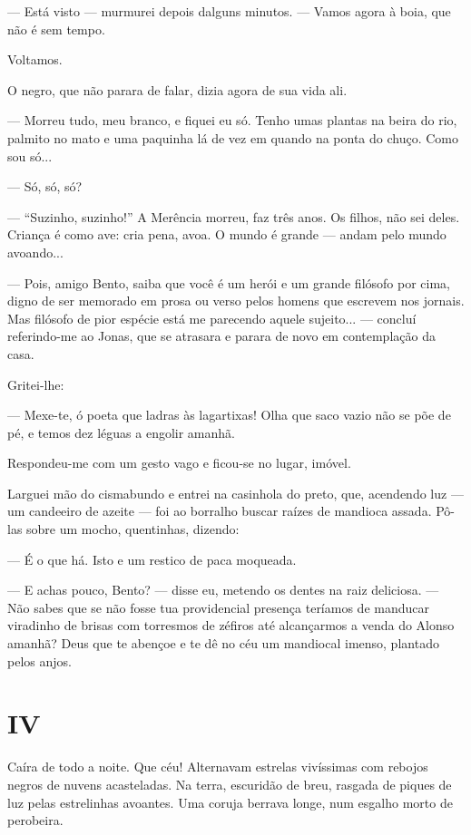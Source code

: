 --- Está visto --- murmurei depois dalguns minutos. --- Vamos agora à
boia, que não é sem tempo.

Voltamos.

O negro, que não parara de falar, dizia agora de sua vida ali.

--- Morreu tudo, meu branco, e fiquei eu só. Tenho umas plantas na beira
do rio, palmito no mato e uma paquinha lá de vez em quando na ponta do
chuço. Como sou só...

--- Só, só, só?

--- ``Suzinho, suzinho!'' A Merência morreu, faz três anos. Os filhos,
não sei deles. Criança é como ave: cria pena, avoa. O mundo é grande ---
andam pelo mundo avoando...

--- Pois, amigo Bento, saiba que você é um herói e um grande filósofo
por cima, digno de ser memorado em prosa ou verso pelos homens que
escrevem nos jornais. Mas filósofo de pior espécie está me parecendo
aquele sujeito... --- concluí referindo-me ao Jonas, que se atrasara e
parara de novo em contemplação da casa.

Gritei-lhe:

--- Mexe-te, ó poeta que ladras às lagartixas! Olha que saco vazio não
se põe de pé, e temos dez léguas a engolir amanhã.

Respondeu-me com um gesto vago e ficou-se no lugar, imóvel.

Larguei mão do cismabundo e entrei na casinhola do preto, que, acendendo
luz --- um candeeiro de azeite --- foi ao borralho buscar raízes de
mandioca assada. Pô-las sobre um mocho, quentinhas, dizendo:

--- É o que há. Isto e um restico de paca moqueada.

--- E achas pouco, Bento? --- disse eu, metendo os dentes na raiz
deliciosa. --- Não sabes que se não fosse tua providencial presença
teríamos de manducar viradinho de brisas com torresmos de zéfiros até
alcançarmos a venda do Alonso amanhã? Deus que te abençoe e te dê no céu
um mandiocal imenso, plantado pelos anjos.

\section{IV}

Caíra de todo a noite. Que céu! Alternavam estrelas vivíssimas com
rebojos negros de nuvens acasteladas. Na terra, escuridão de breu,
rasgada de piques de luz pelas estrelinhas avoantes. Uma coruja berrava
longe, num esgalho morto de perobeira.

